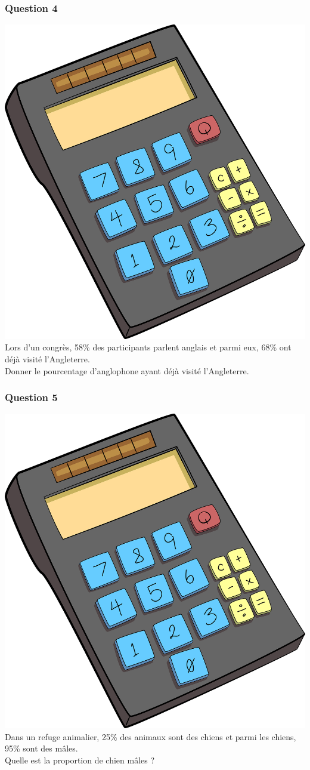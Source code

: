 \documentclass[15pt, mathserif]{beamer}
\begin{document}
\begin{frame} 
	\frametitle{Question 4}
\includegraphics[scale=0.01]{calculatrice} Lors d'un congrès, 58\% des participants parlent anglais et parmi eux, 68\% ont déjà visité l'Angleterre. \\ Donner le pourcentage d'anglophone ayant déjà visité l'Angleterre.\end{frame}


\begin{frame} 
	\frametitle{Question 5}
\includegraphics[scale=0.01]{calculatrice} Dans un refuge animalier, 25\% des animaux sont des chiens et parmi les chiens, 95\% sont des mâles. \\ Quelle est la proportion de chien mâles ?\end{frame}
\end{document}
